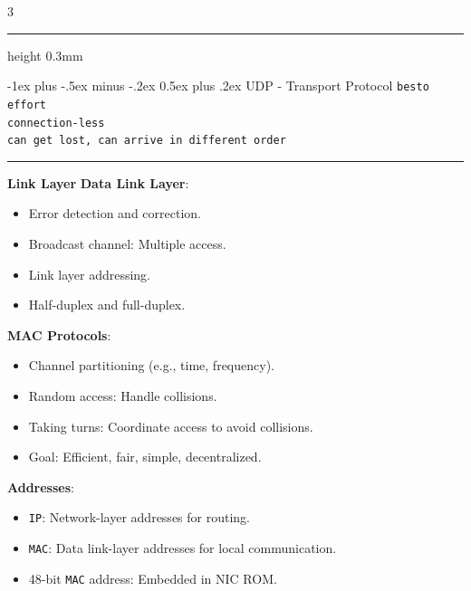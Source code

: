 \documentclass[10pt,landscape]{article}
\makeatletter
\renewcommand{\section}{\@startsection{section}{1}{0mm}%
                                {-1ex plus -.5ex minus -.2ex}%
                                {0.5ex plus .2ex}%
                                {\normalfont\large\bfseries}}
\makeatother
\begin{document}
\begin{multicols}{3}
{{
    }
}
\vspace{0.1cm}
\hrule height 0.3mm 

\section{UDP - Transport Protocol}
\texttt{besto effort}\\
\texttt{connection-less}\\
\texttt{can get lost, can arrive in different order}\\
\hrule
\textbf{Link Layer}
\textbf{Data Link Layer}:
    \begin{itemize}
            \setlength{\itemsep}{0pt}
            \item Error detection and correction.
            \item Broadcast channel: Multiple access.
            \item Link layer addressing.
            \item Half-duplex and full-duplex.
        \end{itemize}
    \textbf{MAC Protocols}:
        \begin{itemize}
            \setlength{\itemsep}{0pt}
            \item Channel partitioning (e.g., time, frequency).
            \item Random access: Handle collisions.
            \item Taking turns: Coordinate access to avoid collisions.
            \item Goal: Efficient, fair, simple, decentralized.
        \end{itemize}
\textbf{Addresses}:
        \vspace{0cm}
        \begin{itemize}
            \setlength{\itemsep}{0pt}
            \item \texttt{IP}: Network-layer addresses for routing.
            \item \texttt{MAC}: Data link-layer addresses for local communication.
            \item 48-bit \texttt{MAC} address: Embedded in NIC ROM.

\end{itemize}
\end{multicols}
\end{document}
